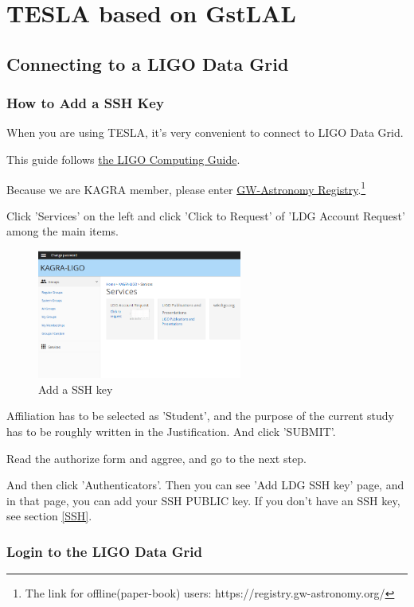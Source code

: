 \section{TESLA based on GstLAL}
\subsection{Connecting to a LIGO Data Grid}
\subsubsection{How to Add a SSH Key}

When you are using TESLA, it's very convenient to connect to LIGO Data Grid.

This guide follows \href{https://computing.docs.ligo.org/guide/computing-centres/ldg/}{the LIGO Computing Guide}.

Because we are KAGRA member, please enter \href{https://registry.gw-astronomy.org/}{GW-Astronomy Registry}.\footnote{The link for offline(paper-book) users: https://registry.gw-astronomy.org/}

Click 'Services' on the left and click 'Click to Request' of 'LDG Account Request' among the main items.

\begin{figure}[h]
\centering
\includegraphics[width=0.6\textwidth]{figs/profile.png}
\caption{Add a SSH key}
\end{figure}

Affiliation has to be selected as 'Student', and the purpose of the current study has to be roughly written in the Justification. And click 'SUBMIT'.

Read the authorize form and aggree, and go to the next step.

And then click 'Authenticators'. Then you can see 'Add LDG SSH key' page, and in that page, you can add your SSH PUBLIC key. If you don't have an SSH key, see section \ref{SSH}.

\subsubsection{Login to the LIGO Data Grid}


